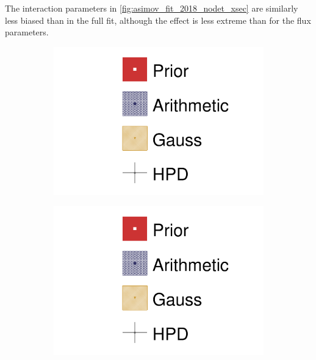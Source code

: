 The interaction parameters in \autoref{fig:asimov_fit_2018_nodet_xsec} are similarly less biased than in the full fit, although the effect is less extreme than for the flux parameters.
\begin{figure}[h]
	\centering
	\begin{subfigure}[t]{0.1\textwidth}
		\includegraphics[width=\textwidth,page=1, trim={0mm 150mm 30mm 0mm}, clip]{figures/mach3/2018/asimov/2018a_MultiPi_Binningv6_NewCov_Asimov_NoDet_merge_drawPar}
	\end{subfigure}
	\begin{subfigure}[t]{0.1\textwidth}
		\includegraphics[width=\textwidth,page=1, trim={0mm 100mm 30mm 50mm}, clip]{figures/mach3/2018/asimov/2018a_MultiPi_Binningv6_NewCov_Asimov_NoDet_merge_drawPar}
	\end{subfigure}

\end{figure}

